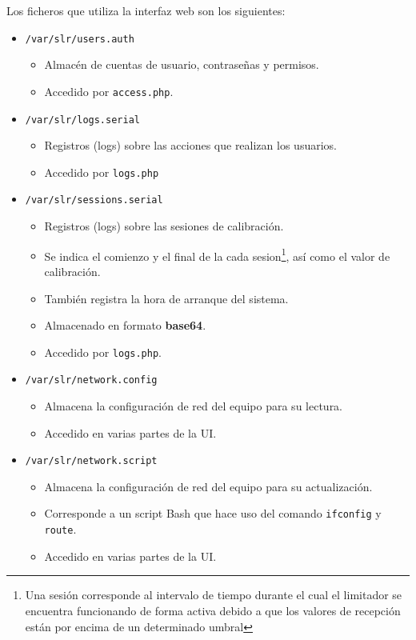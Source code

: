Los ficheros que utiliza la interfaz web son los siguientes:
\begin{itemize}
    \item \verb|/var/slr/users.auth|
    \begin{itemize}
        \item Almacén de cuentas de usuario, contraseñas y permisos.
        \item Accedido por \verb|access.php|.
    \end{itemize}

    \item \verb|/var/slr/logs.serial|
    \begin{itemize}
       \item Registros (logs) sobre las acciones que realizan los usuarios.
       \item Accedido por \verb|logs.php|
    \end{itemize}

    \item \verb|/var/slr/sessions.serial|
    \begin{itemize}
       \item Registros (logs) sobre las sesiones de calibración.
       \item Se indica el comienzo y el final de la cada \gls{sesion}\footnote{Una sesión corresponde al intervalo de tiempo durante el cual el limitador se encuentra funcionando de forma activa debido a que los valores de recepción están por encima de un determinado umbral}, así como el valor de calibración.
       \item También registra la hora de arranque del sistema.
       \item Almacenado en formato \textbf{base64}.
       \item Accedido por \verb|logs.php|.
    \end{itemize}

    \item \verb|/var/slr/network.config|
    \begin{itemize}
        \item Almacena la configuración de red del equipo para su lectura.
        \item Accedido en varias partes de la UI.
    \end{itemize}

    \item \verb|/var/slr/network.script|
    \begin{itemize}
        \item Almacena la configuración de red del equipo para su actualización.
        \item Corresponde a un script Bash que hace uso del comando \verb|ifconfig| y \verb|route|.
        \item Accedido en varias partes de la UI.
    \end{itemize}


\end{itemize}
